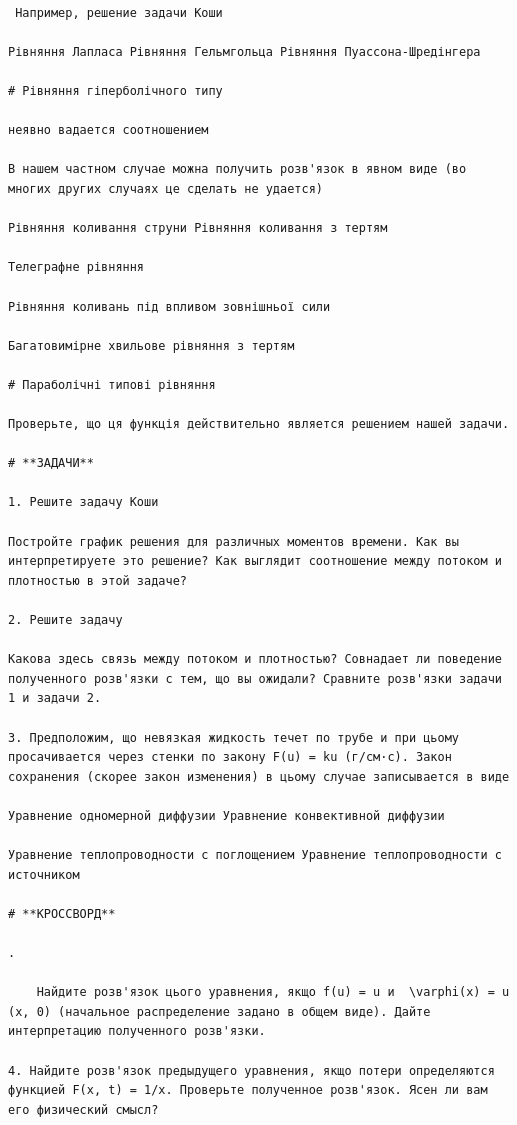 \documentclass[
  ukrainian,
]{article}
\begin{document}
\begin{verbatim}

 Например, решение задачи Коши

Рівняння Лапласа Рівняння Гельмгольца Рівняння Пуассона-Шредінгера

# Рівняння гіперболічного типу

неявно вадается соотношением

В нашем частном случае можна получить розв'язок в явном виде (во многих других случаях це сделать не удается)

Рівняння коливання струни Рівняння коливання з тертям

Телеграфне рівняння

Рівняння коливань під впливом зовнішньої сили

Багатовимірне хвильове рівняння з тертям

# Параболічні типові рівняння

Проверьте, що ця функція действительно является решением нашей задачи.

# **ЗАДАЧИ**

1. Решите задачу Коши

Постройте график решения для различных моментов времени. Как вы интерпретируете это решение? Как выглядит соотношение между потоком и плотностью в этой задаче?

2. Решите задачу

Какова здесь связь между потоком и плотностью? Совнадает ли поведение полученного розв'язки с тем, що вы ожидали? Сравните розв'язки задачи 1 и задачи 2.

3. Предположим, що невязкая жидкость течет по трубе и при цьому просачивается через стенки по закону F(u) = ku (г/см·с). Закон сохранения (скорее закон изменения) в цьому случае записывается в виде

Уравнение одномерной диффузии Уравнение конвективной диффузии

Уравнение теплопроводности с поглощением Уравнение теплопроводности с источником

# **КРОССВОРД**

.

    Найдите розв'язок цього уравнения, якщо f(u) = u и  \varphi(x) = u  (x, 0) (начальное распределение задано в общем виде). Дайте интерпретацию полученного розв'язки.

4. Найдите розв'язок предыдущего уравнения, якщо потери определяются функцией F(x, t) = 1/x. Проверьте полученное розв'язок. Ясен ли вам его физический смысл?


\end{verbatim}
\end{document}
